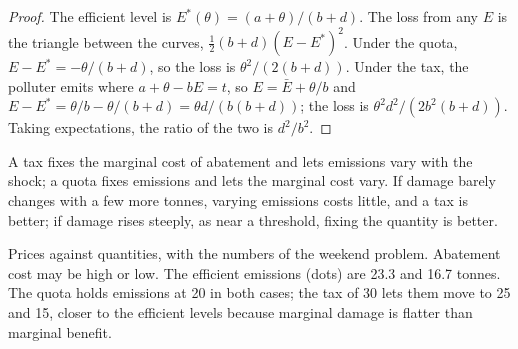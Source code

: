 \begin{proof}
The efficient level is $E^*(\theta) = (a + \theta)/(b + d)$. The loss from any $E$ is the triangle between the curves, $\tfrac12(b + d)(E - E^*)^2$. Under the
quota, $E - E^* = -\theta/(b + d)$, so the loss is $\theta^2/(2(b + d))$. Under the tax, the polluter emits where $a + \theta - bE = t$, so $E = \bar E + \theta/b$ and $E - E^* = \theta/b -
\theta/(b + d) = \theta d/(b(b + d))$; the loss is $\theta^2 d^2/(2b^2(b + d))$. Taking expectations, the ratio of the two is $d^2/b^2$.
\end{proof}

A tax fixes the marginal cost of abatement and lets emissions vary with the shock; a quota fixes emissions and lets the
marginal cost vary. If damage barely changes with a few more tonnes, varying emissions costs little, and a tax is better;
if damage rises steeply, as near a threshold, fixing the quantity is better.

\begin{omfigure}

{\small Prices against quantities, with the numbers of the weekend problem. Abatement cost may be high or low. The efficient
emissions (dots) are 23.3 and 16.7 tonnes. The quota holds emissions at 20 in both cases; the tax of 30 lets them move to 25
and 15, closer to the efficient levels because marginal damage is flatter than marginal benefit.}
\end{omfigure}

